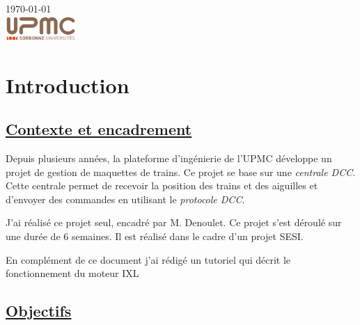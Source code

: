 \begin{titlepage}
{\large \today}\\[2cm] %


\includegraphics[width=0.2\textwidth]{logo.png}


\vfill %

\end{titlepage}




\section{Introduction}
\label{sec:introduction}

\subsection{\underline{Contexte et encadrement}}

Depuis plusieurs ann\'ees, la plateforme d'ingénierie de l'UPMC d\'eveloppe un projet de
gestion de maquettes de trains. Ce projet se base sur une
\emph{centrale DCC}. Cette centrale permet de recevoir la position des
trains et des aiguilles et d'envoyer des commandes en utilisant le
\emph{protocole DCC}.

J'ai r\'ealis\'e ce projet seul, encadr\'e par M. Denoulet. Ce projet s'est d\'eroulé sur une dur\'ee de 6 semaines.
Il est r\'ealis\'e dans le cadre d'un projet SESI.

En complément de ce document j'ai rédigé un tutoriel \cite{interface}
qui décrit le fonctionnement du moteur IXL

\subsection{\underline{Objectifs}}

